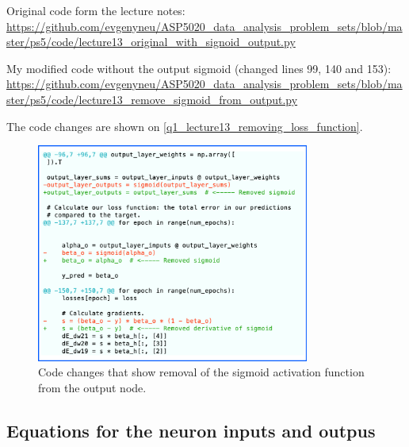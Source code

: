 Original code form the lecture notes: \\ \url{https://github.com/evgenyneu/ASP5020_data_analysis_problem_sets/blob/master/ps5/code/lecture13_original_with_signoid_output.py}

My modified code without the output sigmoid (changed lines 99, 140 and 153): \\ \url{https://github.com/evgenyneu/ASP5020_data_analysis_problem_sets/blob/master/ps5/code/lecture13_remove_sigmoid_from_output.py}

The code changes are shown on \autoref{q1_lecture13_removing_loss_function}.


\begin{figure}[H]
  \centering
  \includegraphics[width=0.8\textwidth]{figures/q1_lecture13_code_changes.png}
  \caption{Code changes that show removal of the sigmoid activation function from the output node.}
  \label{q1_lecture13_removing_loss_function}
\end{figure}



\subsection{Equations for the neuron inputs and outpus}

